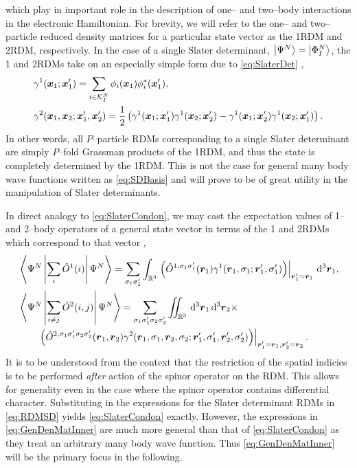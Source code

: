 which play in important role in the description of one-- and two--body interactions in the electronic Hamiltonian. 
For brevity, we will refer to the one-- and two--particle reduced density matrices for a particular state vector 
as the 1RDM and 2RDM, respectively.
In the case of a single Slater determinant, $\left\vert \Psi^N \right\rangle = \left\vert \Phi^N_I \right\rangle$, the 1 and 2RDMs take on an especially simple form due
to \cref{eq:SlaterDet} \cite{Yang89_book},
\begin{align}
  \label{eq:RDMSD}
  &\gamma^1(\boldsymbol{x}_1;\boldsymbol{x}'_1) = \sum_{i \in \mathcal{K}_I^N} \phi_i(\boldsymbol{x}_1) \phi^*_i(\boldsymbol{x}'_1), \\
  &\gamma^2(\boldsymbol{x}_1,\boldsymbol{x}_2; \boldsymbol{x}'_1, \boldsymbol{x}'_2) = 
    \frac{1}{2} \left( \gamma^1(\boldsymbol{x}_1;\boldsymbol{x}'_1)\gamma^1(\boldsymbol{x}_2;\boldsymbol{x}'_2) - \gamma^1(\boldsymbol{x}_1;\boldsymbol{x}'_2)\gamma^1(\boldsymbol{x}_2;\boldsymbol{x}'_1) \right).
\end{align}
In other words, all $P$--particle RDMs corresponding to a single Slater determinant are simply $P$--fold Grassman products of the 1RDM, and thus
the state is completely determined by the 1RDM. This is not the case for general many body wave functions written as \cref{eq:SDBasis} and will
prove to be of great utility in the manipulation of Slater determinants.

In direct analogy to \cref{eq:SlaterCondon}, we may cast the expectation values of 1-- and 2--body operators of a general state vector 
in terms of the 1 and 2RDMs which correspond to that vector
\cite{Yang89_book},
\begin{subequations}
  \label{eq:GenDenMatInner}
\begin{align}
&\left\langle \Psi^N \left\vert \sum_i \hat{O}^1(i) \right\vert \Psi^N \right\rangle = \sum_{\sigma_1\sigma_1'} \int_{\mathbb{R}^3} 
  \left.\left( \hat{O}^{1,\sigma_1\sigma_1'}(\boldsymbol{r}_1) \gamma^1(\boldsymbol{r}_1,\sigma_1; \boldsymbol{r}'_1, \sigma_1') \right) \right \vert_{\boldsymbol{r}'_1 = \boldsymbol{r}_1}
    \,\mathrm{d}^3\boldsymbol{r}_1,\\
&\left\langle \Psi^N \left\vert \sum_{i \neq j} \hat{O}^2(i,j) \right\vert \Psi^N \right\rangle = \sum_{\sigma_1\sigma_1'\sigma_2\sigma_2'}\int\mkern-12mu\int_{\mathbb{R}^3} \,\mathrm{d}^3\boldsymbol{r}_1 \,\mathrm{d}^3\boldsymbol{r}_2  \times\nonumber \\
&\qquad \left.\left( 
    \hat{O}^{2,\sigma_1\sigma_1'\sigma_2\sigma_2'}(\boldsymbol{r}_1,\boldsymbol{r}_2) \gamma^2(\boldsymbol{r}_1,\sigma_1,\boldsymbol{r}_2,\sigma_2; \boldsymbol{r}'_1, \sigma_1',\boldsymbol{r}'_2, \sigma_2')
  \right) \right \vert_{\boldsymbol{r}'_1 = \boldsymbol{r}_1, \boldsymbol{r}'_2 = \boldsymbol{r}_2}. 
\end{align}
\end{subequations}
It is to be understood from the context that the restriction of the spatial indicies is to be performed \emph{after} action of the spinor operator
on the RDM. This allows for generality even in the case where the spinor operator contains differential character.
Substituting in the expressions for the Slater determinant RDMs in \cref{eq:RDMSD} yields \cref{eq:SlaterCondon} exactly. However, the expressions in
\cref{eq:GenDenMatInner} are much more general than that of \cref{eq:SlaterCondon} as they treat an arbitrary many body wave function. Thus
\cref{eq:GenDenMatInner} will be the primary focus in the following.

